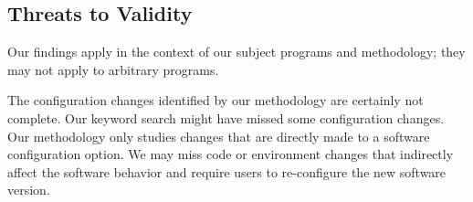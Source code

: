 

\subsection{Threats to Validity}

Our findings apply in the context of our subject programs and methodology;
they may not apply to arbitrary programs.

The configuration changes identified by our methodology are
certainly not complete. Our keyword search might have missed some configuration changes.
Our methodology only studies changes that are directly made to a
software configuration option. We may miss
code or environment changes that indirectly affect the software behavior
and require users to re-configure the new software version.




